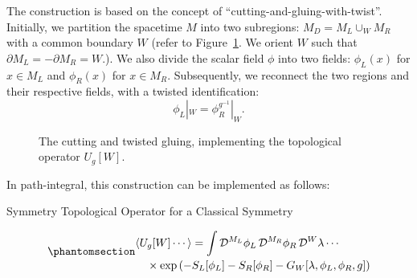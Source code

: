 \documentclass[11pt,toc=bibliography]{scrbook}
\newcommand{\stdim}{D}
\numberwithin{equation}{section}
\newcommand{\stdim}{D}
\begin{document}
The construction is based on the concept of
``cutting-and-gluing-with-twist''. Initially, we partition the spacetime
\(M\) into two subregions: \(M_\stdim = M_L \cup_W M_R\) with a common
boundary \(W\) (refer to Figure~\ref{fig-cut-M}. We orient \(W\) such
that \(\partial M_L = -\partial M_R = W\).). We also divide the scalar
field \(\phi\) into two fields: \(\phi_L(x)\) for \(x \in M_L\) and
\(\phi_R(x)\) for \(x \in M_R\). Subsequently, we reconnect the two
regions and their respective fields, with a twisted identification:
\[ \phi_L|_W = \phi_R^{g^{-1}}|_W. \]

\begin{figure}[t]


\caption{\label{fig-cut-M}The cutting and twisted gluing, implementing
the topological operator \(U_g[W]\).}

\end{figure}%

In path-integral, this construction can be implemented as follows:

\begin{important}{Symmetry Topological Operator for a Classical Symmetry}

\begin{equation}\phantomsection\label{eq-Ug-pathintegral}{
\begin{multlined}
  \langle U_g[W] \cdots \rangle = \int \mathop{\mathcal{D}^{M_L}\phi_L} \mathop{\mathcal{D}^{M_R}\phi_R} \mathop{\mathcal{D}^W\lambda} \cdots\\ \times \exp\left(-S_L[\phi_L]-S_R[\phi_R] - G_W[\lambda,\phi_L,\phi_R,g]\right)
\end{multlined}
}\end{equation}

\end{important}
\end{document}
